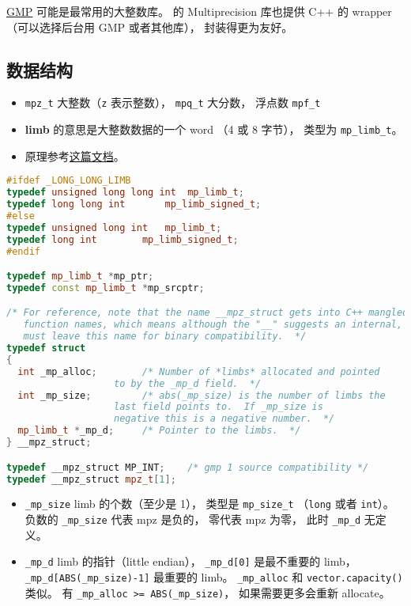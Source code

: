 
\begin{issues}
\issueDraft
\end{issues}

\href{https://gmplib.org/}{GMP} 可能是最常用的大整数库。  的 Multiprecision 库也提供 C++ 的 wrapper （可以选择后台用 GMP 或者其他库）， 封装得更为友好。

\subsection{数据结构}
\begin{itemize}
\item \verb`mpz_t` 大整数（\verb`z` 表示整数）， \verb`mpq_t` 大分数， 浮点数 \verb`mpf_t`
\item \textbf{limb} 的意思是大整数数据的一个 word （4 或 8 字节）， 类型为 \verb`mp_limb_t`。
\item 原理参考\href{https://gmplib.org/manual/Integer-Internals#Integer-Internals}{这篇文档}。
\end{itemize}

\begin{lstlisting}[language=cpp]
#ifdef _LONG_LONG_LIMB
typedef unsigned long long int	mp_limb_t;
typedef long long int		mp_limb_signed_t;
#else
typedef unsigned long int	mp_limb_t;
typedef long int		mp_limb_signed_t;
#endif

typedef mp_limb_t *mp_ptr;
typedef const mp_limb_t *mp_srcptr;

/* For reference, note that the name __mpz_struct gets into C++ mangled
   function names, which means although the "__" suggests an internal, we
   must leave this name for binary compatibility.  */
typedef struct
{
  int _mp_alloc;		/* Number of *limbs* allocated and pointed
				   to by the _mp_d field.  */
  int _mp_size;			/* abs(_mp_size) is the number of limbs the
				   last field points to.  If _mp_size is
				   negative this is a negative number.  */
  mp_limb_t *_mp_d;		/* Pointer to the limbs.  */
} __mpz_struct;

typedef __mpz_struct MP_INT;    /* gmp 1 source compatibility */
typedef __mpz_struct mpz_t[1];
\end{lstlisting}

\begin{itemize}
\item \verb`_mp_size` limb 的个数（至少是 1）， 类型是 \verb`mp_size_t` （\verb`long` 或者 \verb`int`）。 负数的 \verb`_mp_size` 代表 mpz 是负的， 零代表 mpz 为零， 此时 \verb`_mp_d` 无定义。
\item \verb`_mp_d` limb 的指针（little endian）， \verb`_mp_d[0]` 是最不重要的 limb， \verb`_mp_d[ABS(_mp_size)-1]` 最重要的 limb。
\verb`_mp_alloc` 和 \verb`vector.capacity()` 类似。 有 \verb`_mp_alloc >= ABS(_mp_size)`， 如果需要更多会重新 allocate。
\end{itemize}
